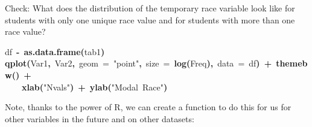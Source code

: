 \documentclass[12pt]{article}
\makeatletter
\newcommand{\hlfunctioncall}[1]{\textcolor[rgb]{0.501960784313725,0,0.329411764705882}{\textbf{#1}}}%
\newcommand{\hlstring}[1]{\textcolor[rgb]{0.6,0.6,1}{#1}}%
\newcommand{\hlkeyword}[1]{\textcolor[rgb]{0,0,0}{\textbf{#1}}}%
\newcommand{\hlargument}[1]{\textcolor[rgb]{0.690196078431373,0.250980392156863,0.0196078431372549}{#1}}%
\newcommand{\hlassignement}[1]{\textcolor[rgb]{0,0,0}{\textbf{#1}}}%
\newcommand{\hlsymbol}[1]{\textcolor[rgb]{0,0,0}{#1}}%
\newcommand{\hlstd}[1]{\textcolor[rgb]{0,0,0}{#1}}%
\newenvironment{kframe}{%
 \def\FrameCommand##1{\hskip\@totalleftmargin \hskip-\fboxsep
 \colorbox{shadecolor}{##1}\hskip-\fboxsep
     \hskip-\linewidth \hskip-\@totalleftmargin \hskip\columnwidth}%
 \MakeFramed {\advance\hsize-\width
   \@totalleftmargin\z@ \linewidth\hsize
   \@setminipage}}%
 {\par\unskip\endMakeFramed}
\newenvironment{knitrout}{}{} %
\renewenvironment{knitrout}{\begin{footnotesize}}{\end{footnotesize}}
\makeatother
\begin{document}
Check:  What does the distribution of the temporary race variable look like for students with only one unique race value and for 
students with more than one race value?

\begin{knitrout}
\color{fgcolor}\begin{kframe}
\begin{flushleft}
\ttfamily\noindent
\hlsymbol{df}{\ }\hlassignement{\usebox{\hlnormalsizeboxlessthan}-}{\ }\hlfunctioncall{as.data.frame}\hlkeyword{(}\hlsymbol{tab1}\hlkeyword{)}\hspace*{\fill}\\
\hlstd{}\hlfunctioncall{qplot}\hlkeyword{(}\hlsymbol{Var1}\hlkeyword{,}{\ }\hlsymbol{Var2}\hlkeyword{,}{\ }\hlargument{geom}{\ }\hlargument{=}{\ }\hlstring{"{}point"{}}\hlkeyword{,}{\ }\hlargument{size}{\ }\hlargument{=}{\ }\hlfunctioncall{log}\hlkeyword{(}\hlsymbol{Freq}\hlkeyword{)}\hlkeyword{,}{\ }\hlargument{data}{\ }\hlargument{=}{\ }\hlsymbol{df}\hlkeyword{)}{\ }\hlkeyword{+}{\ }\hlfunctioncall{theme\usebox{\hlnormalsizeboxunderscore}bw}\hlkeyword{(}\hlkeyword{)}{\ }\hlkeyword{+}\hspace*{\fill}\\
\hlstd{}{\ }{\ }{\ }{\ }\hlfunctioncall{xlab}\hlkeyword{(}\hlstring{"{}Nvals"{}}\hlkeyword{)}{\ }\hlkeyword{+}{\ }\hlfunctioncall{ylab}\hlkeyword{(}\hlstring{"{}Modal{\ }Race"{}}\hlkeyword{)}\mbox{}
\normalfont
\end{flushleft}
\end{kframe}
\end{knitrout}


Note, thanks to the power of R, we can create a function to do this for us for other variables in the future and on other datasets:
\end{document}
